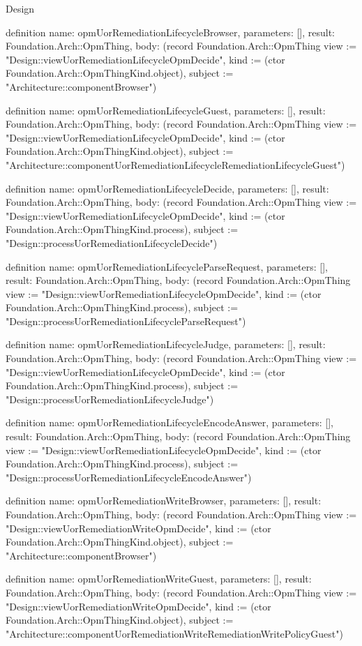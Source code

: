 \begin{lexlean}{Design}
\begin{semanticmodule}
definition{
  name: opmUorRemediationLifecycleBrowser,
  parameters: [],
  result: Foundation.Arch::OpmThing,
  body: (record Foundation.Arch::OpmThing {view := "Design::viewUorRemediationLifecycleOpmDecide", kind := (ctor Foundation.Arch::OpmThingKind.object), subject := "Architecture::componentBrowser"})
}

definition{
  name: opmUorRemediationLifecycleGuest,
  parameters: [],
  result: Foundation.Arch::OpmThing,
  body: (record Foundation.Arch::OpmThing {view := "Design::viewUorRemediationLifecycleOpmDecide", kind := (ctor Foundation.Arch::OpmThingKind.object), subject := "Architecture::componentUorRemediationLifecycleRemediationLifecycleGuest"})
}

definition{
  name: opmUorRemediationLifecycleDecide,
  parameters: [],
  result: Foundation.Arch::OpmThing,
  body: (record Foundation.Arch::OpmThing {view := "Design::viewUorRemediationLifecycleOpmDecide", kind := (ctor Foundation.Arch::OpmThingKind.process), subject := "Design::processUorRemediationLifecycleDecide"})
}

definition{
  name: opmUorRemediationLifecycleParseRequest,
  parameters: [],
  result: Foundation.Arch::OpmThing,
  body: (record Foundation.Arch::OpmThing {view := "Design::viewUorRemediationLifecycleOpmDecide", kind := (ctor Foundation.Arch::OpmThingKind.process), subject := "Design::processUorRemediationLifecycleParseRequest"})
}

definition{
  name: opmUorRemediationLifecycleJudge,
  parameters: [],
  result: Foundation.Arch::OpmThing,
  body: (record Foundation.Arch::OpmThing {view := "Design::viewUorRemediationLifecycleOpmDecide", kind := (ctor Foundation.Arch::OpmThingKind.process), subject := "Design::processUorRemediationLifecycleJudge"})
}

definition{
  name: opmUorRemediationLifecycleEncodeAnswer,
  parameters: [],
  result: Foundation.Arch::OpmThing,
  body: (record Foundation.Arch::OpmThing {view := "Design::viewUorRemediationLifecycleOpmDecide", kind := (ctor Foundation.Arch::OpmThingKind.process), subject := "Design::processUorRemediationLifecycleEncodeAnswer"})
}

definition{
  name: opmUorRemediationWriteBrowser,
  parameters: [],
  result: Foundation.Arch::OpmThing,
  body: (record Foundation.Arch::OpmThing {view := "Design::viewUorRemediationWriteOpmDecide", kind := (ctor Foundation.Arch::OpmThingKind.object), subject := "Architecture::componentBrowser"})
}

definition{
  name: opmUorRemediationWriteGuest,
  parameters: [],
  result: Foundation.Arch::OpmThing,
  body: (record Foundation.Arch::OpmThing {view := "Design::viewUorRemediationWriteOpmDecide", kind := (ctor Foundation.Arch::OpmThingKind.object), subject := "Architecture::componentUorRemediationWriteRemediationWritePolicyGuest"})
}


\end{semanticmodule}
\end{lexlean}
